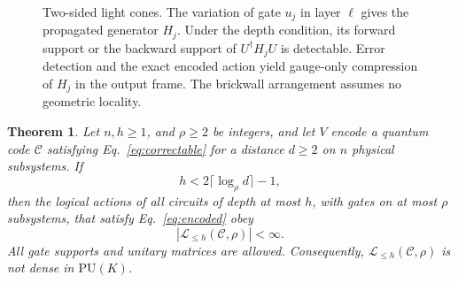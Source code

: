 \documentclass[aps,prl,reprint,notitlepage,nofootinbib,nobibnotes]{revtex4-2}
\newtheorem{theorem}{Theorem}
\newcommand{\PU}{\mathrm{PU}}
\begin{document}
\begin{figure}[!ht]
{%
}
\caption{Two-sided light cones. The variation of gate \(u_j\) in layer \(\ell\) gives the propagated
generator \(H_j\). Under the depth condition, its forward support or
the backward support of \(U^\dagger H_jU\) is detectable.
Error detection and the exact encoded action yield gauge-only
compression of \(H_j\) in the output frame.
The brickwall arrangement assumes no geometric locality.}
\label{fig:mechanisms}
\end{figure}

\begin{samepage}
\begin{theorem}\label{thm:depth}
Let $n,h\ge 1$, and \(\rho\ge2\) be integers, and let
\(V\) encode a quantum code \(\mathcal C\) satisfying Eq.~\eqref{eq:correctable}
for a distance \(d\ge2\) on \(n\) physical subsystems. If
\begin{equation}\label{eq:depth}
  h<2\lceil\log_{\rho} d\rceil-1,
\end{equation}
then the logical actions of all circuits of depth at most \(h\), with gates
on at most \(\rho\) subsystems, that satisfy Eq.~\eqref{eq:encoded} obey
\[
 |\mathcal L_{\le h}(\mathcal C,\rho)|<\infty.
\]
All gate supports and unitary matrices are allowed. Consequently,
\(\mathcal L_{\le h}(\mathcal C,\rho)\) is not dense in \(\PU(K)\).
\end{theorem}
\end{samepage}
\end{document}
